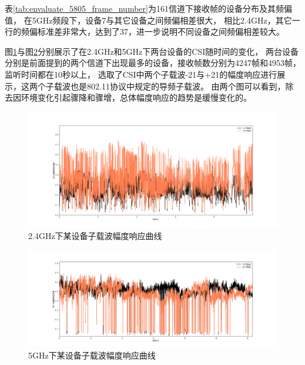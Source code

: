     表\ref{tab:envaluate_5805_frame_number}为161信道下接收帧的设备分布及其频偏值，
    在5GHz频段下，设备7与其它设备之间频偏相差很大，
    相比2.4GHz，其它一行的频偏标准差非常大，达到了37，进一步说明不同设备之间频偏相差较大。

    图\ref{fig:envaluation_csi_2_4g}与图\ref{fig:envaluation_csi_5g}分别展示了在2.4GHz和5GHz下两台设备的CSI随时间的变化，
    两台设备分别是前面提到的两个信道下出现最多的设备，接收帧数分别为4247帧和4953帧，监听时间都在10秒以上，
    选取了CSI中两个子载波-21与+21的幅度响应进行展示，这两个子载波也是802.11协议中规定的导频子载波。
    由两个图可以看到，除去因环境变化引起骤降和骤增，总体幅度响应的趋势是缓慢变化的。
  		\begin{figure}[H]
  			\centering
  			\includegraphics[width=1.0\textwidth]{img/envaluation_csi_2_4g.png}
  			\caption{2.4GHz下某设备子载波幅度响应曲线}
  			\label{fig:envaluation_csi_2_4g}
  		\end{figure}

  		\begin{figure}[H]
  			\centering
  			\includegraphics[width=1.0\textwidth]{img/envaluation_csi_5g.png}
  			\caption{5GHz下某设备子载波幅度响应曲线}
  			\label{fig:envaluation_csi_5g}
  		\end{figure}


